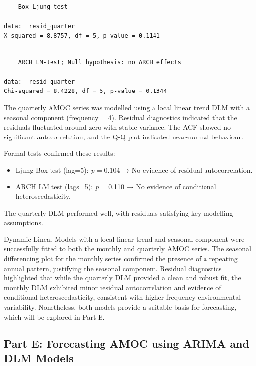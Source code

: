 \documentclass[
  11pt,
]{article}
\begin{document}
\begin{verbatim}

    Box-Ljung test

data:  resid_quarter
X-squared = 8.8757, df = 5, p-value = 0.1141
\end{verbatim}

\begin{verbatim}

    ARCH LM-test; Null hypothesis: no ARCH effects

data:  resid_quarter
Chi-squared = 8.4228, df = 5, p-value = 0.1344
\end{verbatim}

The quarterly AMOC series was modelled using a local linear trend DLM
with a seasonal component (frequency = 4). Residual diagnostics
indicated that the residuals fluctuated around zero with stable
variance. The ACF showed no significant autocorrelation, and the Q-Q
plot indicated near-normal behaviour.

Formal tests confirmed these results:

\begin{itemize}
\item
  Ljung-Box test (lag=5): \emph{p} = 0.104 → No evidence of residual
  autocorrelation.
\item
  ARCH LM test (lags=5): \emph{p} = 0.110 → No evidence of conditional
  heteroscedasticity.
\end{itemize}

The quarterly DLM performed well, with residuals satisfying key
modelling assumptions.

Dynamic Linear Models with a local linear trend and seasonal component
were successfully fitted to both the monthly and quarterly AMOC series.
The seasonal differencing plot for the monthly series confirmed the
presence of a repeating annual pattern, justifying the seasonal
component. Residual diagnostics highlighted that while the quarterly DLM
provided a clean and robust fit, the monthly DLM exhibited minor
residual autocorrelation and evidence of conditional heteroscedasticity,
consistent with higher-frequency environmental variability. Nonetheless,
both models provide a suitable basis for forecasting, which will be
explored in Part E.

\subsection{Part E: Forecasting AMOC using ARIMA and DLM
Models}\label{part-e-forecasting-amoc-using-arima-and-dlm-models}
\end{document}
